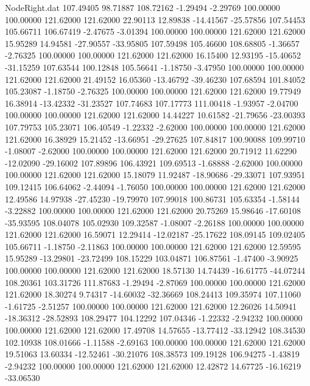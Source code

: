 \begin{filecontents}{NodeRight.dat}
 107.49405   98.71887  108.72162    -1.29494   -2.29769  100.00000  100.00000  121.62000  121.62000   22.90113   12.89838  -14.41567  -25.57856
 107.54453  105.66711  106.67419    -2.47675   -3.01394  100.00000  100.00000  121.62000  121.62000   15.95289   14.94581  -27.90557  -33.95805
 107.59498  105.46600  108.68805    -1.36657   -2.76325  100.00000  100.00000  121.62000  121.62000   16.15400   12.93195  -15.40652  -31.15259
 107.63544  100.12848  105.56641    -1.18750   -3.47950  100.00000  100.00000  121.62000  121.62000   21.49152   16.05360  -13.46792  -39.46230
 107.68594  101.84052  105.23087    -1.18750   -2.76325  100.00000  100.00000  121.62000  121.62000   19.77949   16.38914  -13.42332  -31.23527
 107.74683  107.17773  111.00418    -1.93957   -2.04700  100.00000  100.00000  121.62000  121.62000   14.44227   10.61582  -21.79656  -23.00393
 107.79753  105.23071  106.40549    -1.22332   -2.62000  100.00000  100.00000  121.62000  121.62000   16.38929   15.21452  -13.66951  -29.27625
 107.84817  100.90088  109.99710    -1.08007   -2.62000  100.00000  100.00000  121.62000  121.62000   20.71912   11.62290  -12.02090  -29.16002
 107.89896  106.43921  109.69513    -1.68888   -2.62000  100.00000  100.00000  121.62000  121.62000   15.18079   11.92487  -18.90686  -29.33071
 107.93951  109.12415  106.64062    -2.44094   -1.76050  100.00000  100.00000  121.62000  121.62000   12.49586   14.97938  -27.45230  -19.79970
 107.99018  100.86731  105.63354    -1.58144   -3.22882  100.00000  100.00000  121.62000  121.62000   20.75269   15.98646  -17.60108  -35.93595
 108.04078  105.02930  109.32587    -1.08007   -2.26188  100.00000  100.00000  121.62000  121.62000   16.59071   12.29414  -12.02187  -25.17622
 108.09145  109.02405  105.66711    -1.18750   -2.11863  100.00000  100.00000  121.62000  121.62000   12.59595   15.95289  -13.29801  -23.72499
 108.15229  103.04871  106.87561    -1.47400   -3.90925  100.00000  100.00000  121.62000  121.62000   18.57130   14.74439  -16.61775  -44.07244
 108.20361  103.31726  111.87683    -1.29494   -2.87069  100.00000  100.00000  121.62000  121.62000   18.30274    9.74317  -14.60032  -32.36669
 108.24413  109.35974  107.11060    -1.61725   -2.51257  100.00000  100.00000  121.62000  121.62000   12.26026   14.50941  -18.36312  -28.52893
 108.29477  104.12292  107.04346    -1.22332   -2.94232  100.00000  100.00000  121.62000  121.62000   17.49708   14.57655  -13.77412  -33.12942
 108.34530  102.10938  108.01666    -1.11588   -2.69163  100.00000  100.00000  121.62000  121.62000   19.51063   13.60334  -12.52461  -30.21076
 108.38573  109.19128  106.94275    -1.43819   -2.94232  100.00000  100.00000  121.62000  121.62000   12.42872   14.67725  -16.16219  -33.06530

\end{filecontents}
